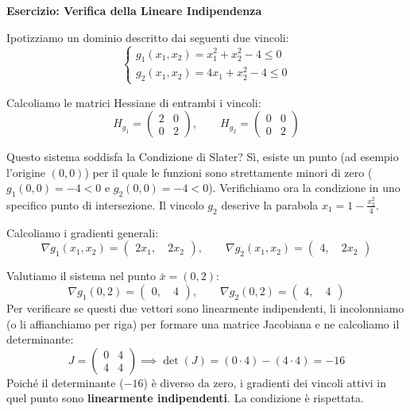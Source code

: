 \documentclass[12pt, a4paper]{article}
\begin{document}
	\textbf{Esercizio: Verifica della Lineare Indipendenza}
	
	Ipotizziamo un dominio descritto dai seguenti due vincoli:
	\[
	\begin{cases}
		g_1(x_1, x_2) = x_1^2 + x_2^2 - 4 \le 0 \\
		g_2(x_1, x_2) = 4x_1 + x_2^2 - 4 \le 0
	\end{cases}
	\]
	
	Calcoliamo le matrici Hessiane di entrambi i vincoli:
	\[
	H_{g_1} = \begin{pmatrix} 2 & 0 \\ 0 & 2 \end{pmatrix}, \qquad H_{g_2} = \begin{pmatrix} 0 & 0 \\ 0 & 2 \end{pmatrix}
	\]
	
	Questo sistema soddisfa la Condizione di Slater? Sì, esiste un punto (ad esempio l'origine $(0,0)$) per il quale le funzioni sono strettamente minori di zero ($g_1(0,0) = -4 < 0$ e $g_2(0,0) = -4 < 0$).
	Verifichiamo ora la condizione in uno specifico punto di intersezione. Il vincolo $g_2$ descrive la parabola $x_1 = 1 - \frac{x_2^2}{4}$.
	
	Calcoliamo i gradienti generali:
	\[
	\nabla g_1(x_1, x_2) = \begin{pmatrix} 2x_1, \quad 2x_2 \end{pmatrix}, \qquad \nabla g_2(x_1, x_2) = \begin{pmatrix} 4, \quad 2x_2 \end{pmatrix}
	\]
	
	Valutiamo il sistema nel punto $\bar{x} = (0, 2)$:
	\[
	\nabla g_1(0,2) = \begin{pmatrix} 0, \quad 4 \end{pmatrix}, \qquad \nabla g_2(0,2) = \begin{pmatrix} 4, \quad 4 \end{pmatrix}
	\]
	Per verificare se questi due vettori sono linearmente indipendenti, li incolonniamo (o li affianchiamo per riga) per formare una matrice Jacobiana e ne calcoliamo il determinante:
	\[
	J = \begin{pmatrix} 0 & 4 \\ 4 & 4 \end{pmatrix} \implies \det(J) = (0 \cdot 4) - (4 \cdot 4) = -16
	\]
	Poiché il determinante ($-16$) è diverso da zero, i gradienti dei vincoli attivi in quel punto sono \textbf{linearmente indipendenti}. La condizione è rispettata.
	
\end{document}
